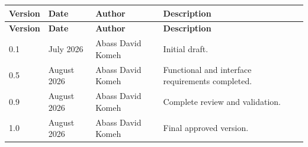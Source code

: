 \begin{longtable}{|p{2cm}|p{3cm}|p{3cm}|p{6cm}|}

\hline

\textbf{Version}

&

\textbf{Date}

&

\textbf{Author}

&

\textbf{Description}

\\

\hline

\endfirsthead

\hline

\textbf{Version}

&

\textbf{Date}

&

\textbf{Author}

&

\textbf{Description}

\\

\hline

\endhead

0.1

&

July 2026

&

Abass David Komeh

&

Initial draft.

\\

\hline

0.5

&

August 2026

&

Abass David Komeh

&

Functional and interface requirements completed.

\\

\hline

0.9

&

August 2026

&

Abass David Komeh

&

Complete review and validation.

\\

\hline

1.0

&

August 2026

&

Abass David Komeh

&

Final approved version.

\\

\hline

\end{longtable}

